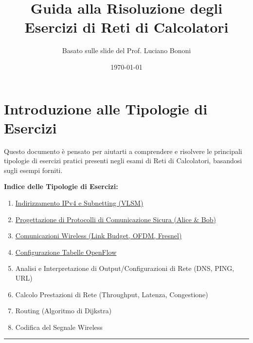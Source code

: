 

\title{Guida alla Risoluzione degli Esercizi di Reti di Calcolatori}
\author{Basato sulle slide del Prof. Luciano Bononi}
\date{\today}



\maketitle
\tableofcontents
\newpage

\section{Introduzione alle Tipologie di Esercizi} %
Questo documento è pensato per aiutarti a comprendere e risolvere le principali tipologie di esercizi pratici presenti negli esami di Reti di Calcolatori, basandosi sugli esempi forniti.

\bigskip %

\textbf{Indice delle Tipologie di Esercizi:}
\begin{enumerate}[label=\arabic*.] %
    \item \hyperref[sec:ipv4-subnetting]{Indirizzamento IPv4 e Subnetting (VLSM)}
    \item \hyperref[sec:protocolli-sicuri]{Progettazione di Protocolli di Comunicazione Sicura (Alice \& Bob)}
    \item \hyperref[sec:wireless]{Comunicazioni Wireless (Link Budget, OFDM, Fresnel)}
    \item \hyperref[sec:openflow]{Configurazione Tabelle OpenFlow}
    \item Analisi e Interpretazione di Output/Configurazioni di Rete (DNS, PING, URL) %
    \item Calcolo Prestazioni di Rete (Throughput, Latenza, Congestione) %
    \item Routing (Algoritmo di Dijkstra) %
    \item Codifica del Segnale Wireless %
\end{enumerate}

\hrule %

